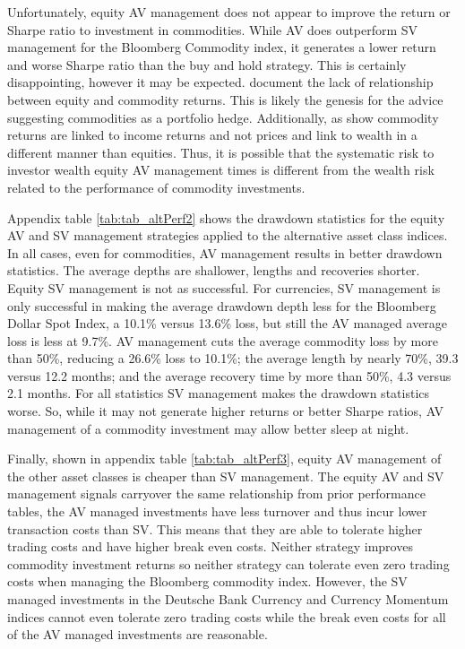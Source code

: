 Unfortunately, equity AV management does not appear to improve the return or Sharpe ratio to investment in commodities. While AV does outperform SV management for the Bloomberg Commodity index, it generates a lower return and worse Sharpe ratio than the buy and hold strategy. This is certainly disappointing, however it may be expected. \citet{gorton_facts_2006,buyuksahin_commodities_2008,NBERw21243} document the lack of relationship between equity and commodity returns. This is likely the genesis for the advice suggesting commodities as a portfolio hedge. Additionally, as \citet{erb_conquering_nodate} show commodity returns are linked to income returns and not prices and link to wealth in a different manner than equities. Thus, it is possible that the systematic risk to investor wealth equity AV management times is different from the wealth risk related to the performance of commodity investments.


Appendix table \ref{tab:tab_altPerf2} shows the drawdown statistics for the equity AV and SV management strategies applied to the alternative asset class indices. In all cases, even for commodities, AV management results in better drawdown statistics. The average depths are shallower, lengths and recoveries shorter. Equity SV management is not as successful. For currencies, SV management is only successful in making the average drawdown depth less for the Bloomberg Dollar Spot Index, a 10.1\% versus 13.6\% loss, but still the AV managed average loss is less at 9.7\%. AV management cuts the average commodity loss by more than 50\%, reducing a 26.6\% loss to 10.1\%; the average length by nearly 70\%, 39.3 versus 12.2 months; and the average recovery time by more than 50\%, 4.3 versus 2.1 months. For all statistics SV management makes the drawdown statistics worse. So, while it may not generate higher returns or better Sharpe ratios, AV management of a commodity investment may allow better sleep at night.


Finally, shown in appendix table \ref{tab:tab_altPerf3}, equity AV management of the other asset classes is cheaper than SV management. The equity AV and SV management signals carryover the same relationship from prior performance tables, the AV managed investments have less turnover and thus incur lower transaction costs than SV. This means that they are able to tolerate higher trading costs and have higher break even costs. Neither strategy improves commodity investment returns so neither strategy can tolerate even zero trading costs when managing the Bloomberg commodity index. However, the SV managed investments in the Deutsche Bank Currency and Currency Momentum indices cannot even tolerate zero trading costs while the break even costs for all of the AV managed investments are reasonable.


